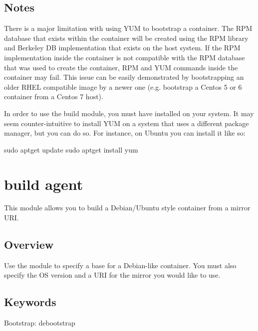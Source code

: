 \documentclass[letterpaper,10pt,english]{sphinxmanual}
\begin{document}
\subsection{Notes}
\label{\detokenize{appendix:id11}}
There is a major limitation with using YUM to bootstrap a container. The RPM
database that exists within the container will be created using the RPM library
and Berkeley DB implementation that exists on the host system. If the RPM
implementation inside the container is not compatible with the RPM database that
was used to create the container, RPM and YUM commands inside the container may
fail. This issue can be easily demonstrated by bootstrapping an older RHEL
compatible image by a newer one (e.g. bootstrap a Centos 5 or 6 container from a
Centos 7 host).

In order to use the  build module, you must have 
installed on your system. It may seem counter-intuitive to install YUM on a
system that uses a different package manager, but you can do so. For instance,
on Ubuntu you can install it like so:

%
\begin{sphinxVerbatim}[commandchars=\\\{\}]
\PYGZdl{} sudo apt\PYGZhy{}get update \PYGZam{}\PYGZam{} sudo apt\PYGZhy{}get install yum
\end{sphinxVerbatim}


\section{ build agent}
\label{\detokenize{appendix:debootstrap-build-agent}}\label{\detokenize{appendix:build-debootstrap}}\label{\detokenize{appendix:sec-build-debootstrap}}
This module allows you to build a Debian/Ubuntu style container from a mirror
URI.


\subsection{Overview}
\label{\detokenize{appendix:id12}}
Use the  module to specify a base for a Debian-like container.
You must also specify the OS version and a URI for the mirror you would like to
use.


\subsection{Keywords}
\label{\detokenize{appendix:id13}}
%
\begin{sphinxVerbatim}[commandchars=\\\{\}]
Bootstrap: debootstrap
\end{sphinxVerbatim}
\end{document}
